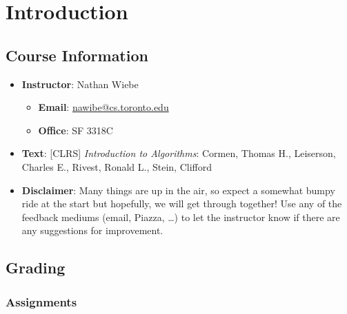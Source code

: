 \chapter{Introduction}

\section{Course Information}

\begin{itemize}
    \item \textbf{Instructor}: Nathan Wiebe

    \begin{itemize}
        \item \textbf{Email}: \href{mailto:nawibe@cs.toronto.edu}{nawibe@cs.toronto.edu}
        \item \textbf{Office}: SF 3318C
    \end{itemize}

    \item \textbf{Text}: [CLRS] \textit{Introduction to Algorithms}: Cormen, Thomas H., Leiserson, Charles E., Rivest, Ronald L., Stein, Clifford

    

    \item \textbf{Disclaimer}: Many things are up in the air, so expect a somewhat bumpy ride at the start but hopefully, we will get through together! Use any of the feedback mediums (email, Piazza, \dots) to let the instructor know if there are any suggestions for improvement. 
\end{itemize}

\section{Grading}

\subsection{Assignments}

